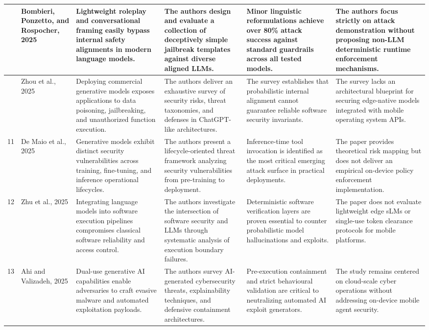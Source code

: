 \begin{center}
\begin{longtable}{|>{\centering\arraybackslash}p{0.55cm}|p{2.0cm}|p{2.7cm}|p{2.8cm}|p{2.7cm}|p{2.7cm}|}
9 & Bombieri, Ponzetto, and Rospocher, 2025 \cite{bombieri2025dangerous} & Lightweight roleplay and conversational framing easily bypass internal safety alignments in modern language models. & The authors design and evaluate a collection of deceptively simple jailbreak templates against diverse aligned LLMs. & Minor linguistic reformulations achieve over 80\% attack success against standard guardrails across all tested models. & The authors focus strictly on attack demonstration without proposing non-LLM deterministic runtime enforcement mechanisms. \\
\hline

10 & Zhou et al., 2025 \cite{zhou2025security} & Deploying commercial generative models exposes applications to data poisoning, jailbreaking, and unauthorized function execution. & The authors deliver an exhaustive survey of security risks, threat taxonomies, and defenses in ChatGPT-like architectures. & The survey establishes that probabilistic internal alignment cannot guarantee reliable software security invariants. & The survey lacks an architectural blueprint for securing edge-native models integrated with mobile operating system APIs. \\
\hline

11 & De Maio et al., 2025 \cite{de2025lifecycle} & Generative models exhibit distinct security vulnerabilities across training, fine-tuning, and inference operational lifecycles. & The authors present a lifecycle-oriented threat framework analyzing security vulnerabilities from pre-training to deployment. & Inference-time tool invocation is identified as the most critical emerging attack surface in practical deployments. & The paper provides theoretical risk mapping but does not deliver an empirical on-device policy enforcement implementation. \\
\hline

12 & Zhu et al., 2025 \cite{zhu2025when} & Integrating language models into software execution pipelines compromises classical software reliability and access control. & The authors investigate the intersection of software security and LLMs through systematic analysis of execution boundary failures. & Deterministic software verification layers are proven essential to counter probabilistic model hallucinations and exploits. & The paper does not evaluate lightweight edge sLMs or single-use token clearance protocols for mobile platforms. \\
\hline

13 & Ahi and Valizadeh, 2025 \cite{ahi2025large} & Dual-use generative AI capabilities enable adversaries to craft evasive malware and automated exploitation payloads. & The authors survey AI-generated cybersecurity threats, explainability techniques, and defensive containment architectures. & Pre-execution containment and strict behavioural validation are critical to neutralizing automated AI exploit generators. & The study remains centered on cloud-scale cyber operations without addressing on-device mobile agent security. \\
\hline


\end{longtable}
\end{center}
